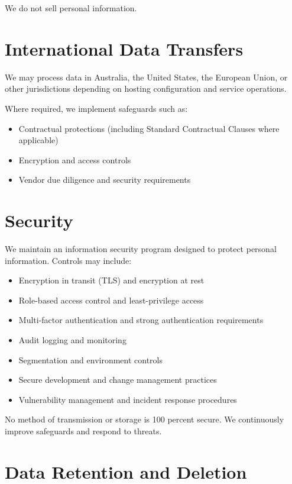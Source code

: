 \documentclass[11pt]{article}
\begin{document}
We do not sell personal information.

\section{International Data Transfers}

We may process data in Australia, the United States, the European Union, or other jurisdictions depending on hosting configuration and service operations.

Where required, we implement safeguards such as:

\begin{itemize}
\item Contractual protections (including Standard Contractual Clauses where applicable)
\item Encryption and access controls
\item Vendor due diligence and security requirements
\end{itemize}

\section{Security}

We maintain an information security program designed to protect personal information. Controls may include:

\begin{itemize}
\item Encryption in transit (TLS) and encryption at rest
\item Role-based access control and least-privilege access
\item Multi-factor authentication and strong authentication requirements
\item Audit logging and monitoring
\item Segmentation and environment controls
\item Secure development and change management practices
\item Vulnerability management and incident response procedures
\end{itemize}

No method of transmission or storage is 100 percent secure. We continuously improve safeguards and respond to threats.

\section{Data Retention and Deletion}
\end{document}
